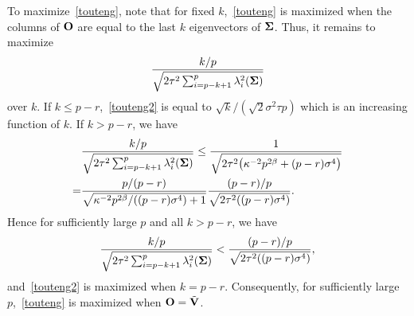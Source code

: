 \documentclass[review]{elsarticle}
\theoremstyle{plain}
\theoremstyle{definition}
\theoremstyle{remark}
\begin{document}
To maximize~\eqref{touteng}, note that for fixed $k$,~\eqref{touteng} is maximized when the columns of $\mathbf{O}$ are equal to the last $k$ eigenvectors of $\boldsymbol{\Sigma}$.
Thus, it remains to maximize
\begin{equation}\label{touteng2}
\frac{k/p}{\sqrt{2\tau^2\sum_{i=p-k+1}^p \lambda_i^2 (\boldsymbol{\Sigma})}}
\end{equation}
over $k$.
If $k\leq p-r$,~\eqref{touteng2} is equal to $\sqrt{k}/(\sqrt{2} \sigma^2 \tau p)$ which is an increasing function of $k$.
If $k> p-r$, we have
\begin{equation*}
    \begin{aligned}
        &\frac{k/p}{\sqrt{2\tau^2\sum_{i=p-k+1}^p \lambda_i^2(\boldsymbol{\Sigma})}}
        \leq
        \frac{1}{\sqrt{2\tau^2\big(\kappa^{-2}p^{2\beta}+(p-r)\sigma^4\big)}}\\
        =&
        \frac{p/(p-r)}{\sqrt{\kappa^{-2}p^{2\beta}/((p-r)\sigma^4)+1}}
\frac{(p-r)/p}{\sqrt{2\tau^2((p-r)\sigma^4)}}.
    \end{aligned}
\end{equation*}
Hence for sufficiently large $p$ and all $k>p-r$, we have
\begin{equation*}
    \begin{aligned}
        \frac{k/p}{\sqrt{2\tau^2\sum_{i=p-k+1}^p \lambda_i^2(\boldsymbol{\Sigma})}}
        <
\frac{(p-r)/p}{\sqrt{2\tau^2((p-r)\sigma^4)}},
    \end{aligned}
\end{equation*}
and~\eqref{touteng2} is maximized when $k=p-r$.
Consequently, for sufficiently large $p$,~\eqref{touteng} is maximized when $\mathbf{O}=\tilde{\mathbf{V}}$.
\end{document}
